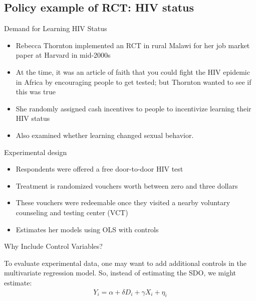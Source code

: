\documentclass{beamer}
\begin{document}
\subsection{Policy example of RCT: HIV status}

\begin{frame}{Demand for Learning HIV Status}


  \begin{itemize}
    \item Rebecca Thornton implemented an RCT in rural Malawi for her job market paper at Harvard in mid-2000s
    \item At the time, it was an article of faith that you could fight the HIV epidemic in Africa by encouraging people to get tested; but Thornton wanted to see if this was true
    \item She randomly assigned cash incentives to people to incentivize learning their HIV status
    \item Also examined whether learning changed sexual behavior.
  \end{itemize}

\end{frame}

\begin{frame}{Experimental design}

  \begin{itemize}
    \item Respondents were offered a free door-to-door HIV test
    \item Treatment is randomized vouchers worth between zero and three dollars
    \item These vouchers were redeemable once they visited a nearby voluntary counseling and testing center (VCT)
    \item Estimates her models using OLS with controls
  \end{itemize}

\end{frame}


\begin{frame}{Why Include Control Variables?}

  To evaluate experimental data, one may want to add additional controls in the multivariate regression model.  So, instead of estimating the SDO, we might estimate:
  \begin{eqnarray*}
    Y_i = \alpha + \delta D_i + \gamma X_i + \eta_i
  \end{eqnarray*}
\end{frame}
\end{document}
